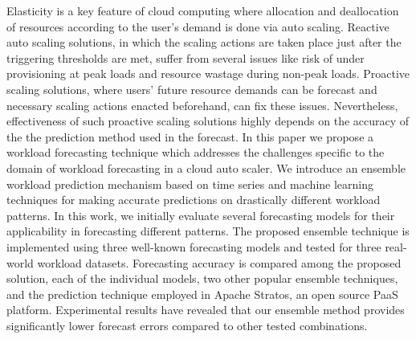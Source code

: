 Elasticity is a key feature of cloud computing where allocation and deallocation of resources according to the user’s demand is done via auto scaling. Reactive auto scaling solutions, in which the scaling actions are taken place just after the triggering thresholds are met, suffer from several issues like risk of under provisioning at peak loads and resource wastage during non-peak loads. Proactive scaling solutions, where users’ future resource demands can be forecast and necessary scaling actions enacted beforehand, can fix these issues. Nevertheless, effectiveness of such proactive scaling solutions highly depends on the accuracy of the the prediction method used in the forecast. In this paper we propose a workload forecasting technique which addresses the challenges specific to the domain of workload forecasting in a cloud auto scaler. We introduce an ensemble workload prediction mechanism based on time series and machine learning techniques for making accurate predictions on drastically different workload patterns. In this work, we initially evaluate several forecasting models for their applicability in forecasting different patterns. The proposed ensemble technique is implemented using three well-known forecasting models and tested for three real-world workload datasets. Forecasting accuracy is compared among the proposed solution, each of the individual models, two other popular ensemble techniques, and the prediction technique employed in Apache Stratos, an open source PaaS platform. Experimental results have revealed that our ensemble method provides significantly lower forecast errors compared to other tested combinations.